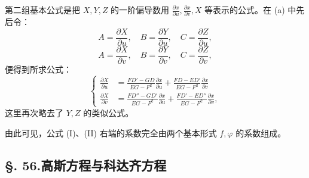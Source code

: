 第二组基本公式是把 \(X,Y,Z\) 的一阶偏导数用
\(\frac{\partial x}{\partial u}, \frac{\partial x}{\partial v}, X\) 等表示的公式。在 (a) 中先后令：
\[
 A=\frac{\partial X}{\partial u},\quad
 B=\frac{\partial Y}{\partial u},\quad
 C=\frac{\partial Z}{\partial u},
\]
\[
 A=\frac{\partial X}{\partial v},\quad
 B=\frac{\partial Y}{\partial v},\quad
 C=\frac{\partial Z}{\partial v},
\]
便得到所求公式：
\begin{equation}\tag{II}
\left\{
\begin{aligned}
 \frac{\partial X}{\partial u}
 &=
 \frac{FD'-GD}{EG-F^2}\frac{\partial x}{\partial u}
 +\frac{FD-ED'}{EG-F^2}\frac{\partial x}{\partial v}\\
 \frac{\partial X}{\partial v}
 &=
 \frac{FD''-GD'}{EG-F^2}\frac{\partial x}{\partial u}
 +\frac{FD'-ED''}{EG-F^2}\frac{\partial x}{\partial v},
\end{aligned}
\right.
\end{equation}
这里再次略去了 \(Y,Z\) 的类似公式。

由此可见，公式 (I)、(II) 右端的系数完全由两个基本形式 \(f,\varphi\) 的系数组成。

\subsection*{\S. 56.\quad 高斯方程与科达齐方程}

